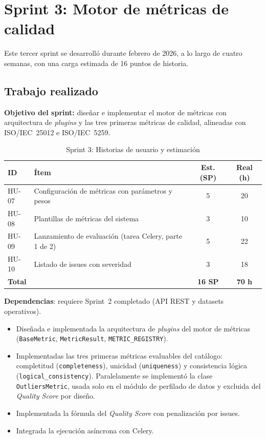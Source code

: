 \section{Sprint 3: Motor de métricas de calidad}
\label{sec:sprint3}
Este tercer sprint se desarrolló durante febrero de 2026, a lo largo de cuatro
semanas, con una carga estimada de 16 puntos de historia.

\subsection{Trabajo realizado}

\textbf{Objetivo del sprint:} diseñar e implementar el motor de métricas con
arquitectura de \emph{plugins} y las tres primeras métricas de calidad,
alineadas con \ac{ISO}/\ac{IEC}~25012 e \ac{ISO}/\ac{IEC}~5259.

\begin{table}[htbp]
  \centering
  \small
  \caption{Sprint 3: Historias de usuario y estimación}
  \label{tab:sprint3-hu}
  \begin{tabularx}{\textwidth}{l X c c}
    \toprule
    \textbf{ID} & \textbf{Ítem} & \textbf{Est. (SP)} & \textbf{Real (h)} \\
    \midrule
    HU-07 & Configuración de métricas con parámetros y pesos & 5 & 20 \\
    HU-08 & Plantillas de métricas del sistema & 3 & 10 \\
    HU-09 & Lanzamiento de evaluación (tarea Celery, parte 1 de 2) & 5 & 22 \\
    HU-10 & Listado de issues con severidad & 3 & 18 \\
    \midrule
    \multicolumn{2}{l}{\textbf{Total}} & \textbf{16 SP} & \textbf{70 h} \\
    \bottomrule
  \end{tabularx}
\end{table}

\textbf{Dependencias}: requiere Sprint~2 completado (API \ac{REST} y datasets
operativos).

\begin{itemize}
  \item Diseñada e implementada la arquitectura de \emph{plugins} del motor
    de métricas (\texttt{BaseMetric}, \texttt{MetricResult},
    \texttt{METRIC\_REGISTRY}).
  \item Implementadas las tres primeras métricas evaluables del catálogo:
    completitud (\texttt{completeness}), unicidad (\texttt{uniqueness}) y
    consistencia lógica (\texttt{logical\_consistency}).  Paralelamente se
    implementó la clase \texttt{OutliersMetric}, usada solo en el módulo de
    perfilado de datos y excluida del \emph{Quality Score} por diseño.
  \item Implementada la fórmula del \emph{Quality Score} con penalización por
    issues.
  \item Integrada la ejecución asíncrona con Celery.
\end{itemize}

